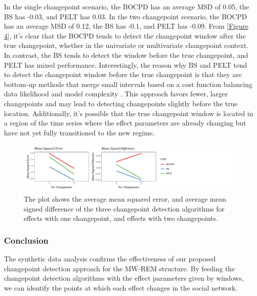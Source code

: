 \documentclass[]{interact}
\theoremstyle{plain}%
\theoremstyle{definition}
\theoremstyle{remark}
\begin{document}
{    In the single changepoint scenario, the BOCPD has an average MSD of 0.05, the BS has -0.03, and PELT has 0.03. In the two changepoint scenario, the BOCPD has an average MSD of 0.12, the BS has -0.1, and PELT has -0.09. From \autoref{Figure 4}, it's clear that the BOCPD tends to detect the changepoint window after the true changepoint, whether in the univariate or multivariate changepoint context. In contrast, the BS tends to detect the window before the true changepoint, and PELT has mixed performance. Interestingly, the reason why BS and PELT tend to detect the changepoint window before the true changepoint is that they are bottom-up methods that merge small intervals based on a cost function balancing data likelihood and model complexity \cite{killickOptimalDetectionChangepoints2012}. This approach favors fewer, larger changepoints and may lead to detecting changepoints slightly before the true location. Additionally, it's possible that the true changepoint window is located in a region of the time series where the effect parameters are already changing but have not yet fully transitioned to the new regime.
    
    \begin{figure}[h]
    	\captionsetup{justification=raggedright}
    	\renewcommand{\figurename}{Figure}
    	\centering
    	\includegraphics[width=\textwidth,height=\textheight,keepaspectratio]{MSEMSD}
    	\caption{\fontsize{8}{10}\selectfont The plot shows the average mean squared error, and average mean signed difference of the three changepoint detection algorithms for effects with one changepoint, and effects with two changepoints.}
    	\label{Figure 4}
    \end{figure}

    \subsubsection{Conclusion}

    \hspace{0.28cm} The synthetic data analysis confirms the effectiveness of our proposed changepoint detection approach for the MW-REM structure. By feeding the changepoint detection algorithms with the effect parameters given by windows, we can identify the points at which each effect changes in the social network. \\
    
}
\end{document}
